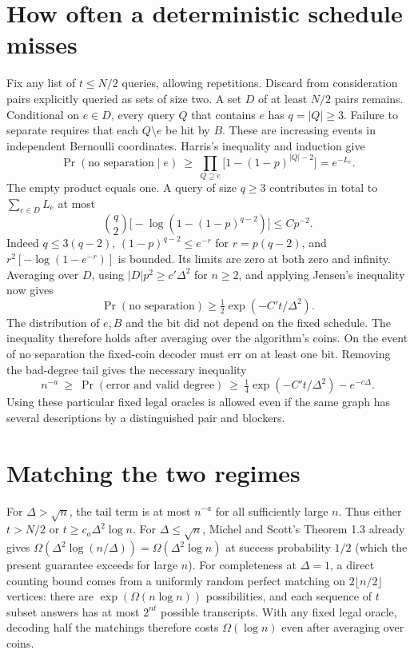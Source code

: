\documentclass[11pt]{article}
\begin{document}
\section{How often a deterministic schedule misses}
Fix any list of $t\le N/2$ queries, allowing repetitions. Discard from consideration pairs explicitly queried as sets of size two. A set $D$ of at least $N/2$ pairs remains. Conditional on $e\in D$, every query $Q$ that contains $e$ has $q=|Q|\ge3$. Failure to separate requires that each $Q\setminus e$ be hit by $B$. These are increasing events in independent Bernoulli coordinates. Harris's inequality and induction give
\[
 \Pr(\text{no separation}\mid e)\ \ge\
 \prod_{Q\supseteq e}\big[1-(1-p)^{|Q|-2}\big]=e^{-L_e}.
\]
The empty product equals one. A query of size $q\ge3$ contributes in total to $\sum_{e\in D}L_e$ at most
\[
 \binom q2\big[-\log(1-(1-p)^{q-2})\big]\le C p^{-2}.
\]
Indeed $q\le3(q-2)$, $(1-p)^{q-2}\le e^{-r}$ for $r=p(q-2)$, and $r^2[-\log(1-e^{-r})]$ is bounded. Its limits are zero at both zero and infinity. Averaging over $D$, using $|D|p^2\ge c'\Delta^2$ for $n\ge2$, and applying Jensen's inequality now gives
\[
 \Pr(\text{no separation})\ge \tfrac12\exp(-C't/\Delta^2).
\]
The distribution of $e,B$ and the bit did not depend on the fixed schedule. The inequality therefore holds after averaging over the algorithm's coins. On the event of no separation the fixed-coin decoder must err on at least one bit. Removing the bad-degree tail gives the necessary inequality
\[
 n^{-a}\ \ge\ \Pr(\text{error and valid degree})\ \ge\
 \tfrac14\exp(-C't/\Delta^2)-e^{-c\Delta}.
\]
Using these particular fixed legal oracles is allowed even if the same graph has several descriptions by a distinguished pair and blockers.

\section{Matching the two regimes}
For $\Delta>\sqrt n$, the tail term is at most $n^{-a}$ for all sufficiently large $n$. Thus either $t>N/2$ or $t\ge c_a\Delta^2\log n$. For $\Delta\le\sqrt n$, Michel and Scott's Theorem 1.3 already gives $\Omega(\Delta^2\log(n/\Delta))=\Omega(\Delta^2\log n)$ at success probability $1/2$ (which the present guarantee exceeds for large $n$). For completeness at $\Delta=1$, a direct counting bound comes from a uniformly random perfect matching on $2\lfloor n/2\rfloor$ vertices: there are $\exp(\Omega(n\log n))$ possibilities, and each sequence of $t$ subset answers has at most $2^{nt}$ possible transcripts. With any fixed legal oracle, decoding half the matchings therefore costs $\Omega(\log n)$ even after averaging over coins.
\end{document}
